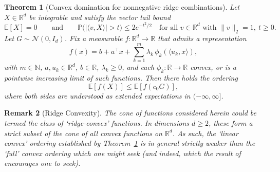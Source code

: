 \documentclass[11pt]{article}
\newcommand{\R}{\mathbb{R}}
\newcommand{\N}{\mathbb{N}}
\newcommand{\Pbb}{\mathbb{P}}
\newcommand{\Ebb}{\mathbb{E}}
\newcommand{\cN}{\mathcal{N}}
\newtheorem{theorem}{Theorem}
\newtheorem{remark}[theorem]{Remark}
\begin{document}
\begin{theorem}[Convex domination for nonnegative ridge combinations]
\label{thm:ridge_cone_domination}
Let $X\in\R^d$ be integrable and satisfy the vector tail bound
%
\begin{equation}
\label{eq:vector_subg_tail}
\Ebb [X] = 0
\qquad\text{and}\qquad
\Pbb \big( | \langle v, X \rangle| > t \big) \le 2e^{-t^2/2}
\quad \text{for all } v \in \R^d \text{ with } \|v\|_2 = 1,\ t \ge 0.
\end{equation}
%
Let $G \sim \cN(0,I_d)$.
Fix a measurable $f : \R^d \to \R$ that admits a representation
%
\begin{equation}
\label{eq:ridge_rep}
f(x) = b + a^\top x + \sum_{k=1}^m \lambda_k \, \phi_k (\langle u_k, x \rangle),
\end{equation}
%
with $m \in \N$, $a, u_k \in \R^d$, $b \in \R$, $\lambda_k \ge 0$, and each $\phi_k :\R \to \R$ convex, or is a pointwise increasing limit of such functions.
Then there holds the ordering
%
\[
\Ebb [f (X)] \le \Ebb [f (c_0 G)],
\]
%
where both sides are understood as extended expectations in $(-\infty, \infty]$.
\end{theorem}

\begin{remark}[Ridge Convexity]
The cone of functions considered herein could be termed the class of `ridge-convex' functions. In dimensions $d \ge 2$, these form a strict subset of the cone of all convex functions on $\mathbb{R}^d$. As such, the `linear convex' ordering established by Theorem~\ref{thm:ridge_cone_domination} is in general strictly weaker than the `full' convex ordering which one might seek (and indeed, which the result of \cite{vanHandelSubgComparison} encourages one to seek).
\end{remark}
\end{document}

